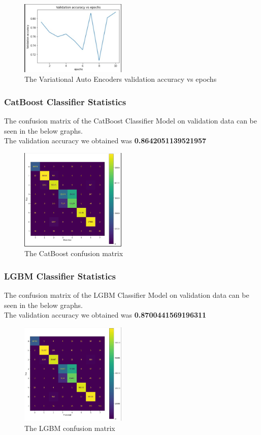 \documentclass[10pt,twocolumn,letterpaper]{article}
\begin{document}
\begin{figure}[h]
    \includegraphics[width = 0.45\textwidth]{src/img/graphs/an_val_acc.jpg}
    \caption{The Variational Auto Encoders validation accuracy vs epochs}
    \label{fig:incep}
\end{figure}
\subsubsection{CatBoost Classifier Statistics}
The confusion matrix of the CatBoost Classifier Model on validation data can be seen in the below graphs.\\
The validation accuracy we obtained was \textbf{0.8642051139521957}
\begin{figure}[h]
    \includegraphics[width = 0.45\textwidth]{src/img/results/cat_cm.jpg}
    \caption{The CatBoost confusion matrix}
    \label{fig:incep}
\end{figure}

\subsubsection{LGBM Classifier Statistics}
The confusion matrix of the LGBM Classifier Model on validation data can be seen in the below graphs.\\
The validation accuracy we obtained was \textbf{0.8700441569196311}
\begin{figure}[h]
    \includegraphics[width = 0.45\textwidth]{src/img/results/lg_cm.jpg}
    \caption{The LGBM confusion matrix}
    \label{fig:incep}
\end{figure}
\end{document}
